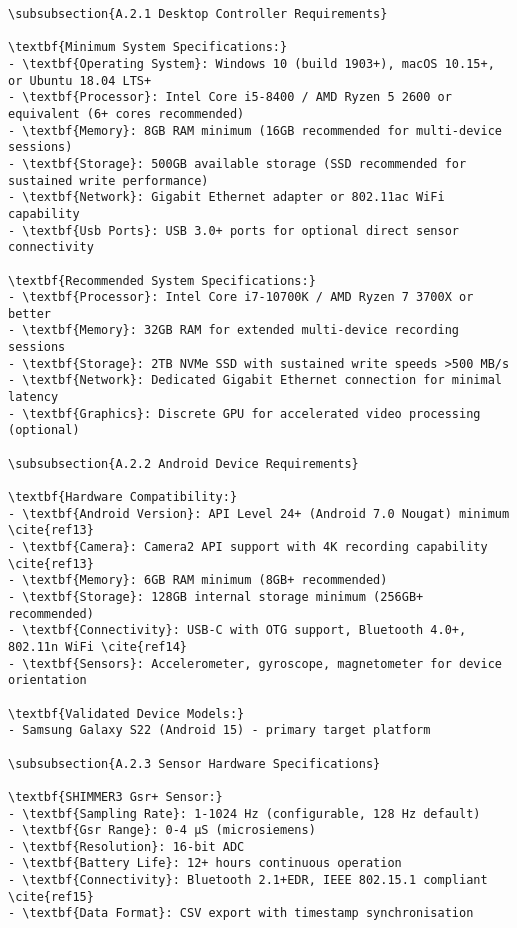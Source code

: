 \begin{verbatim}
\subsubsection{A.2.1 Desktop Controller Requirements}

\textbf{Minimum System Specifications:}
- \textbf{Operating System}: Windows 10 (build 1903+), macOS 10.15+, or Ubuntu 18.04 LTS+
- \textbf{Processor}: Intel Core i5-8400 / AMD Ryzen 5 2600 or equivalent (6+ cores recommended)
- \textbf{Memory}: 8GB RAM minimum (16GB recommended for multi-device sessions)
- \textbf{Storage}: 500GB available storage (SSD recommended for sustained write performance)
- \textbf{Network}: Gigabit Ethernet adapter or 802.11ac WiFi capability
- \textbf{Usb Ports}: USB 3.0+ ports for optional direct sensor connectivity

\textbf{Recommended System Specifications:}
- \textbf{Processor}: Intel Core i7-10700K / AMD Ryzen 7 3700X or better
- \textbf{Memory}: 32GB RAM for extended multi-device recording sessions
- \textbf{Storage}: 2TB NVMe SSD with sustained write speeds >500 MB/s
- \textbf{Network}: Dedicated Gigabit Ethernet connection for minimal latency
- \textbf{Graphics}: Discrete GPU for accelerated video processing (optional)

\subsubsection{A.2.2 Android Device Requirements}

\textbf{Hardware Compatibility:}
- \textbf{Android Version}: API Level 24+ (Android 7.0 Nougat) minimum \cite{ref13}
- \textbf{Camera}: Camera2 API support with 4K recording capability \cite{ref13}
- \textbf{Memory}: 6GB RAM minimum (8GB+ recommended)
- \textbf{Storage}: 128GB internal storage minimum (256GB+ recommended)
- \textbf{Connectivity}: USB-C with OTG support, Bluetooth 4.0+, 802.11n WiFi \cite{ref14}
- \textbf{Sensors}: Accelerometer, gyroscope, magnetometer for device orientation

\textbf{Validated Device Models:}
- Samsung Galaxy S22 (Android 15) - primary target platform

\subsubsection{A.2.3 Sensor Hardware Specifications}

\textbf{SHIMMER3 Gsr+ Sensor:}
- \textbf{Sampling Rate}: 1-1024 Hz (configurable, 128 Hz default)
- \textbf{Gsr Range}: 0-4 μS (microsiemens)
- \textbf{Resolution}: 16-bit ADC
- \textbf{Battery Life}: 12+ hours continuous operation
- \textbf{Connectivity}: Bluetooth 2.1+EDR, IEEE 802.15.1 compliant \cite{ref15}
- \textbf{Data Format}: CSV export with timestamp synchronisation


\end{verbatim}
